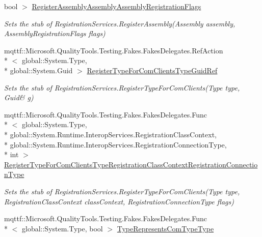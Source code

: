 \begin{DoxyCompactItemize}
bool $>$ \hyperlink{class_system_1_1_runtime_1_1_interop_services_1_1_fakes_1_1_stub_registration_services_a4724fcb20e762d0185303007811c47c1}{Register\-Assembly\-Assembly\-Assembly\-Registration\-Flags}
\begin{DoxyCompactList}\small\item\em Sets the stub of Registration\-Services.\-Register\-Assembly(\-Assembly assembly, Assembly\-Registration\-Flags flags)\end{DoxyCompactList}\item 
mqttf\-::\-Microsoft.\-Quality\-Tools.\-Testing.\-Fakes.\-Fakes\-Delegates.\-Ref\-Action\\*
$<$ global\-::\-System.\-Type, \\*
global\-::\-System.\-Guid $>$ \hyperlink{class_system_1_1_runtime_1_1_interop_services_1_1_fakes_1_1_stub_registration_services_ab8e8471caa4cee0480ed103faf8794d9}{Register\-Type\-For\-Com\-Clients\-Type\-Guid\-Ref}
\begin{DoxyCompactList}\small\item\em Sets the stub of Registration\-Services.\-Register\-Type\-For\-Com\-Clients(Type type, Guid\& g)\end{DoxyCompactList}\item 
mqttf\-::\-Microsoft.\-Quality\-Tools.\-Testing.\-Fakes.\-Fakes\-Delegates.\-Func\\*
$<$ global\-::\-System.\-Type, \\*
global\-::\-System.\-Runtime.\-Interop\-Services.\-Registration\-Class\-Context, \\*
global\-::\-System.\-Runtime.\-Interop\-Services.\-Registration\-Connection\-Type, \\*
int $>$ \hyperlink{class_system_1_1_runtime_1_1_interop_services_1_1_fakes_1_1_stub_registration_services_a1c9e7948997542da5a8a8c3a24e56de7}{Register\-Type\-For\-Com\-Clients\-Type\-Registration\-Class\-Context\-Registration\-Connection\-Type}
\begin{DoxyCompactList}\small\item\em Sets the stub of Registration\-Services.\-Register\-Type\-For\-Com\-Clients(\-Type type, Registration\-Class\-Context class\-Context, Registration\-Connection\-Type flags)\end{DoxyCompactList}\item 
mqttf\-::\-Microsoft.\-Quality\-Tools.\-Testing.\-Fakes.\-Fakes\-Delegates.\-Func\\*
$<$ global\-::\-System.\-Type, bool $>$ \hyperlink{class_system_1_1_runtime_1_1_interop_services_1_1_fakes_1_1_stub_registration_services_ad2249c2b459aeedc0b75d0102a3b41ae}{Type\-Represents\-Com\-Type\-Type}

\end{DoxyCompactItemize}
